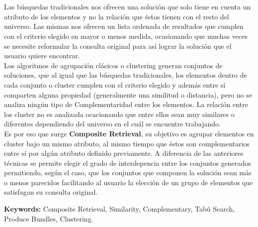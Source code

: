 \chapter*{\runtitle}

\noindent Las búsquedas tradicionales nos ofrecen una solución que solo tiene en cuenta un atributo de los elementos y no la relación que éstos tienen con el resto del universo. Las mismas nos ofrecen un lista ordenada de resultados que cumplen con el criterio elegido en mayor o menos medida, ocasionando que muchas veces se necesite reformular la consulta original para así lograr la solución que el usuario quiere encontrar.\\
Los algoritmos de agrupación clásicos o clustering generan conjuntos de soluciones, que al igual que las búsquedas tradicionales, los elementos dentro de cada conjunto o cluster cumplen con el criterio elegido y además entre sí comparten alguna propiedad (generalmente una similitud o distancia), pero no se analiza ningún tipo de Complementaridad entre los elementos. La relación entre los cluster no es analizada ocacionando que entre ellos sean muy similares o diferentes dependiendo del universo en el cuál se encuentre trabajando.\\
Es por eso que surge \textbf{Composite Retrieval}, su objetivo es agrupar elementos en cluster bajo un mismo atributo, al mismo tiempo que éstos son complementarios entre sí por algún atributo definido previamente. A diferencia de las anteriores técnicas se permite elegir el grado de interdepencia entre los conjuntos generados permitiendo, según el caso, que los conjuntos que componen la solución sean más o menos parecidos facilitando al usuario la elección de un grupo de elementos que satisfagan su consulta original.

\bigskip

\noindent\textbf{Keywords:} Composite Retrieval, Similarity, Complementary, Tabú Search, Produce Bundles, Clustering.